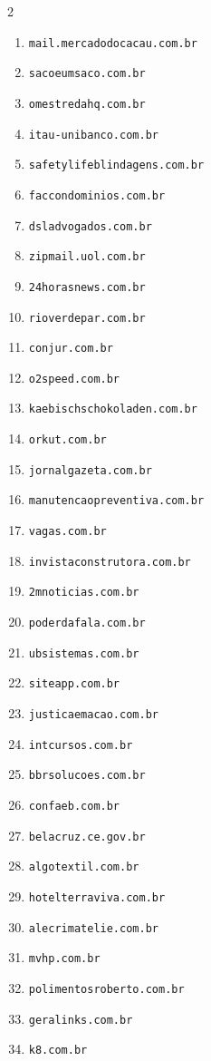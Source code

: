 \begin{multicols}{2}
\begin{enumerate}
    \item \texttt{mail.mercadodocacau.com.br}
    \item \texttt{sacoeumsaco.com.br}
    \item \texttt{omestredahq.com.br}
    \item \texttt{itau-unibanco.com.br}
    \item \texttt{safetylifeblindagens.com.br}
    \item \texttt{faccondominios.com.br}
    \item \texttt{dsladvogados.com.br}
    \item \texttt{zipmail.uol.com.br}
    \item \texttt{24horasnews.com.br}
    \item \texttt{rioverdepar.com.br}
    \item \texttt{conjur.com.br}
    \item \texttt{o2speed.com.br}
    \item \texttt{kaebischschokoladen.com.br}
    \item \texttt{orkut.com.br}
    \item \texttt{jornalgazeta.com.br}
    \item \texttt{manutencaopreventiva.com.br}
    \item \texttt{vagas.com.br}
    \item \texttt{invistaconstrutora.com.br}
    \item \texttt{2mnoticias.com.br}
    \item \texttt{poderdafala.com.br}
    \item \texttt{ubsistemas.com.br}
    \item \texttt{siteapp.com.br}
    \item \texttt{justicaemacao.com.br}
    \item \texttt{intcursos.com.br}
    \item \texttt{bbrsolucoes.com.br}
    \item \texttt{confaeb.com.br}
    \item \texttt{belacruz.ce.gov.br}
    \item \texttt{algotextil.com.br}
    \item \texttt{hotelterraviva.com.br}
    \item \texttt{alecrimatelie.com.br}
    \item \texttt{mvhp.com.br}
    \item \texttt{polimentosroberto.com.br}
    \item \texttt{geralinks.com.br}
    \item \texttt{k8.com.br}

\end{enumerate}
\end{multicols}
